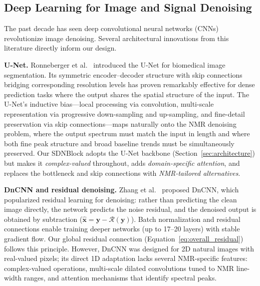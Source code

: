 \subsection{Deep Learning for Image and Signal Denoising}
\label{sec:rw_dl_denoising}

The past decade has seen deep convolutional neural networks (CNNs)
revolutionize image denoising. Several architectural innovations from this
literature directly inform our design.

\textbf{U-Net.}
Ronneberger et al.\ \cite{Ronneberger2015} introduced the U-Net for biomedical
image segmentation. Its symmetric encoder--decoder structure with skip
connections bridging corresponding resolution levels has proven remarkably
effective for dense prediction tasks where the output shares the spatial
structure of the input. The U-Net's inductive bias---local processing via
convolution, multi-scale representation via progressive down-sampling and
up-sampling, and fine-detail preservation via skip connections---maps
naturally onto the NMR denoising problem, where the output spectrum must
match the input in length and where both fine peak structure and broad
baseline trends must be simultaneously preserved. Our SDNBlock adopts the
U-Net backbone (Section~\ref{sec:architecture}) but makes it
\emph{complex-valued} throughout, adds \emph{domain-specific attention},
and replaces the bottleneck and skip connections with
\emph{NMR-tailored alternatives}.

\textbf{DnCNN and residual denoising.}
Zhang et al.\ \cite{Zhang2017} proposed DnCNN, which popularized residual
learning for denoising: rather than predicting the clean image directly,
the network predicts the noise residual, and the denoised output is obtained
by subtraction ($\hat{\mathbf{x}} = \mathbf{y} - \mathcal{R}(\mathbf{y})$).
Batch normalization and residual connections enable training deeper networks
(up to 17--20 layers) with stable gradient flow. Our global residual
connection (Equation~\ref{eq:overall_residual}) follows this principle.
However, DnCNN was designed for 2D natural images with real-valued pixels;
its direct 1D adaptation lacks several NMR-specific features: complex-valued
operations, multi-scale dilated convolutions tuned to NMR line-width ranges,
and attention mechanisms that identify spectral peaks.

